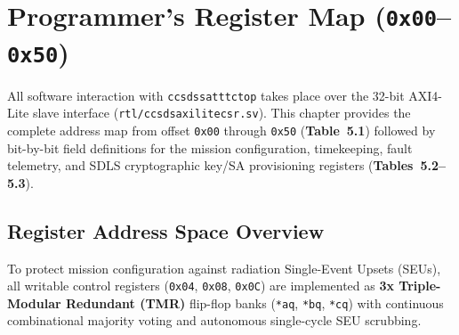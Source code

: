 \documentclass[10pt,a4paper]{article}
\renewcommand{\_}{\origunderscore\penalty0\hskip0pt\relax}
\numberwithin{table}{section}
\numberwithin{figure}{section}
\numberwithin{equation}{section}
\begin{document}
\clearpage
\section{Programmer's Register Map (\texttt{0x00}--\texttt{0x50})}

All software interaction with \texttt{ccsds\_sat\_ttc\_top} takes place over the 32-bit AXI4-Lite slave interface (\texttt{rtl/ccsds\_axi\_lite\_csr.sv}). This chapter provides the complete address map from offset \texttt{0x00} through \texttt{0x50} (\textbf{Table~5.1}) followed by bit-by-bit field definitions for the mission configuration, timekeeping, fault telemetry, and SDLS cryptographic key/SA provisioning registers (\textbf{Tables~5.2--5.3}).

\subsection{Register Address Space Overview}
To protect mission configuration against radiation Single-Event Upsets (SEUs), all writable control registers (\texttt{0x04}, \texttt{0x08}, \texttt{0x0C}) are implemented as \textbf{3x Triple-Modular Redundant (TMR)} flip-flop banks (\texttt{*\_a\_q}, \texttt{*\_b\_q}, \texttt{*\_c\_q}) with continuous combinational majority voting and autonomous single-cycle SEU scrubbing.
\end{document}
